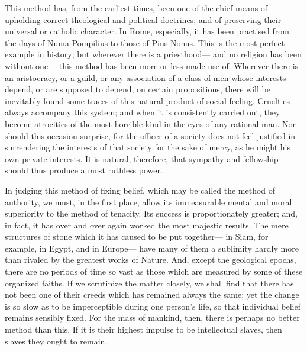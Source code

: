 \documentclass[]{article}
\begin{document}
This method has, from the earliest times, been one of the chief means of upholding correct theological and political doctrines, and of preserving their universal or catholic character. In Rome, especially, it has been practised from the days of Numa Pompilius to those of Pius Nonus. This is the most perfect example in history; but wherever there is a priesthood--- and no religion has been without one--- this method has been more or less made use of. Wherever there is an aristocracy, or a guild, or any association of a class of men whose interests depend, or are supposed to depend, on certain propositions, there will be inevitably found some traces of this natural product of social feeling. Cruelties always accompany this system; and when it is consistently carried out, they become atrocities of the most horrible kind in the eyes of any rational man. Nor should this occasion surprise, for the officer of a society does not feel justified in surrendering the interests of that society for the sake of mercy, as he might his own private interests. It is natural, therefore, that sympathy and fellowship should thus produce a most ruthless power.

In judging this method of fixing belief, which may be called the method of authority, we must, in the first place, allow its immeasurable mental and moral superiority to the method of tenacity. Its success is proportionately greater; and, in fact, it has over and over again worked the most majestic results. The mere structures of stone which it has caused to be put together--- in Siam, for example, in Egypt, and in Europe--- have many of them a sublimity hardly more than rivaled by the greatest works of Nature. And, except the geological epochs, there are no periods of time so vast as those which are measured by some of these organized faiths. If we scrutinize the matter closely, we shall find that there has not been one of their creeds which has remained always the same; yet the change is so slow as to be imperceptible during one person's life, so that individual belief remains sensibly fixed. For the mass of mankind, then, there is perhaps no better method than this. If it is their highest impulse to be intellectual slaves, then slaves they ought to remain.
\end{document}

